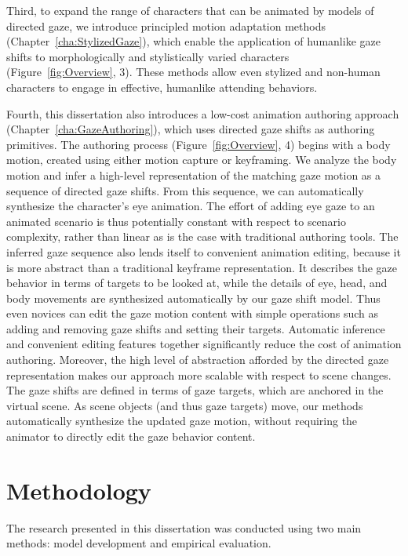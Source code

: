 Third, to expand the range of characters that can be animated by models of directed gaze, we introduce principled motion adaptation methods (Chapter~\ref{cha:StylizedGaze}), which enable the application of humanlike gaze shifts to morphologically and stylistically varied characters (Figure~\ref{fig:Overview}, 3). These methods allow even stylized and non-human characters to engage in effective, humanlike attending behaviors.

Fourth, this dissertation also introduces a low-cost animation authoring approach (Chapter~\ref{cha:GazeAuthoring}), which uses directed gaze shifts as authoring primitives.
The authoring process (Figure~\ref{fig:Overview}, 4) begins with a body motion, created using either motion capture or keyframing. We analyze the body motion and infer a high-level representation of the matching gaze motion as a sequence of directed gaze shifts.
From this sequence, we can automatically synthesize the character's eye animation. The effort of adding eye gaze to an animated scenario is thus potentially constant with respect to scenario complexity, rather than linear as is the case with traditional authoring tools.
The inferred gaze sequence also lends itself to convenient animation editing, because it is more abstract than a traditional keyframe representation. It describes the gaze behavior in terms of targets to be looked at, while the details of eye, head, and body movements are synthesized automatically by our gaze shift model. Thus even novices can edit the gaze motion content with simple operations such as adding and removing gaze shifts and setting their targets.
Automatic inference and convenient editing features together significantly reduce the cost of animation authoring.
Moreover, the high level of abstraction afforded by the directed gaze representation makes our approach more scalable with respect to scene changes. The gaze shifts are defined in terms of gaze targets, which are anchored in the virtual scene. As scene objects (and thus gaze targets) move, our methods automatically synthesize the updated gaze motion, without requiring the animator to directly edit the gaze behavior content.

\section{Methodology}

The research presented in this dissertation was conducted using two main methods: model development and empirical evaluation.

